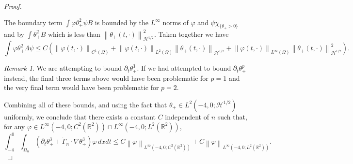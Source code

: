 \documentclass[11pt]{amsart}
\theoremstyle{remark}
\newtheorem*{remark}{Remark}
\theoremstyle{definition}
\newcommand{\R}{\mathbb{R}}
\newcommand{\norm}[1]{\left\lVert#1\right\rVert}
\newcommand{\paren}[1]{\left( #1 \right)}
\newcommand{\del}{\partial}
\newcommand{\grad}{\nabla}
\newcommand{\indic}[1]{\chi_{\{#1\}}}
\newcommand{\HD}{\mathcal{H}}
\begin{document}
\begin{proof}
\begin{itemize}
The boundary term $\int \varphi \theta_+^2 \psi B$ is bounded by the $L^\infty$ norms of $\varphi$ and $\psi \indic{\theta_+>0}$ and by $\int \theta_+^2 B$ which is less than $\norm{\theta_+(t,\cdot)}_{\HD^{1/2}}^2$.  Taken together we have
\[ \int \varphi \theta_+^2 \Lambda \psi \leq C \paren{ \norm{\varphi(t,\cdot)}_{C^1(\Omega)} + \norm{\varphi(t,\cdot)}_{L^2(\Omega)} \norm{\theta_+(t,\cdot)}_{\HD^{1/2}} + \norm{\varphi(t,\cdot)}_{L^\infty(\Omega)} \norm{\theta_+(t,\cdot)}_{\HD^{1/2}}^2 }. \]
%

\end{itemize}

\begin{remark}
We are attempting to bound $\del_t \theta_+^3$.  If we had attempted to bound $\del_t \theta_+^p$ instead, the final three terms above would have been problematic for $p=1$ and the very final term would have been problematic for $p=2$.  
\end{remark}

Combining all of these bounds, and using the fact that $\theta_+ \in L^2(-4,0; \HD^{1/2})$ uniformly, we conclude that there exists a constant $C$ independent of $n$ such that, for any $\varphi \in L^\infty(-4,0; C^2(\R^2)) \cap L^\infty(-4,0; L^2(\R^2))$, 
\begin{equation} \label{theta3 compact in time} \int_{-4}^0 \int_{\Omega_n} \paren{ \del_t \theta_+^3 + \dot{\Gamma}_n \cdot \grad \theta_+^3 } \varphi \,dxdt \leq C \norm{\varphi}_{L^\infty(-4,0; C^2(\R^2))} + C \norm{\varphi}_{L^\infty(-4,0; L^2(\R^2))}. \end{equation}


\end{proof}
\end{document}
